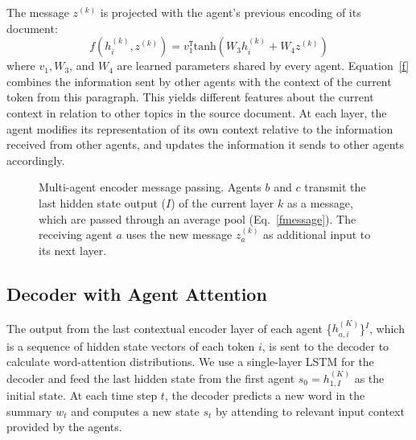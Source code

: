 \documentclass[11pt,a4paper]{article}
\begin{document}
The message $z^{(k)}$ is projected with the agent's previous encoding of its document:
\begin{equation}
f(h^{(k)}_{i},z^{(k)}) = v_1^{\mathtt{T}}\text{tanh}(W_3h_{i}^{(k)}+W_4z^{(k)})
\label{f}
\end{equation}
where $v_1, W_3$, and $W_4$ are learned parameters shared by every agent. Equation~\eqref{f} combines the information sent by other agents with the context of the current token from this paragraph. This yields different features about the current context in relation to other topics in the source document. At each layer, the agent modifies its representation of its own context relative to the information received from other agents, and updates the information it sends to other agents accordingly.
 \begin{figure}[t]
\begin{center} 
\end{center} 
\vskip -0.19in
\caption{Multi-agent encoder message passing. Agents $b$ and $c$ transmit the last hidden state output ($I$) of the current layer $k$ as a message, which are passed through an average pool (Eq.~\eqref{fmessage}). The receiving agent $a$ uses the new message $\textstyle z_a^{(k)}$ as additional input to its next layer.}
\label{fpicmessagepassing}
\end{figure}
\subsection{Decoder with Agent Attention}
\label{uciki}
The output from the last contextual encoder layer of each agent \{$h^{(K)}_{a,i}$\}$^I$, which is a sequence of hidden state vectors of each token $i$, is sent to the decoder to calculate word-attention distributions. 
We use a single-layer LSTM for the decoder and feed the last hidden state from the first agent $s_0 = h^{(K)}_{1,I}$ as the initial state. 
At each time step $t$, the decoder predicts a new word in the summary $w_t$ and computes a new state $s_t$ by attending to relevant input context provided by the agents.
\end{document}
